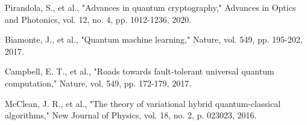 \documentclass[onecolumn]{IEEEtran}
\begin{document}
\begin{thebibliography}{15}
Pirandola, S., et al., "Advances in quantum cryptography," Advances in Optics and Photonics, vol. 12, no. 4, pp. 1012-1236, 2020.

Biamonte, J., et al., "Quantum machine learning," Nature, vol. 549, pp. 195-202, 2017.

Campbell, E. T., et al., "Roads towards fault-tolerant universal quantum computation," Nature, vol. 549, pp. 172-179, 2017.

McClean, J. R., et al., "The theory of variational hybrid quantum-classical algorithms," New Journal of Physics, vol. 18, no. 2, p. 023023, 2016.

\end{thebibliography}
\end{document}
